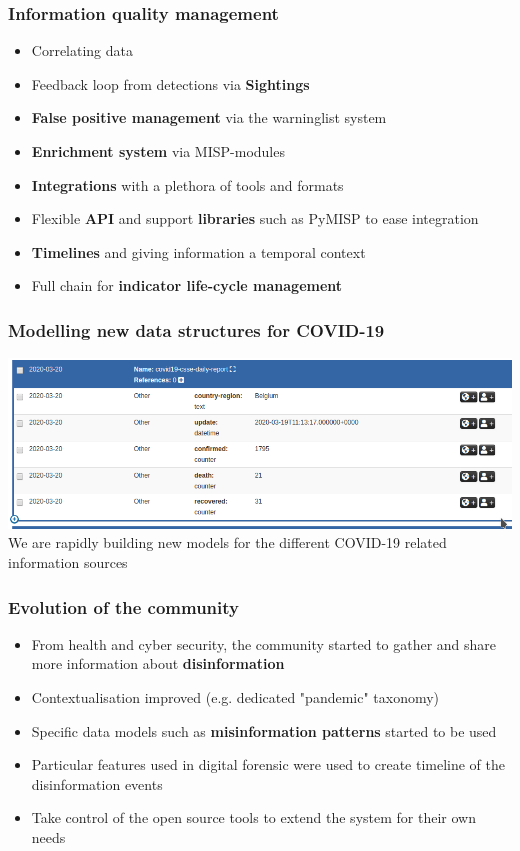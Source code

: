 \begin{frame}
\frametitle{Information quality management}
    \begin{itemize}
        \item Correlating data
        \item Feedback loop from detections via {\bf Sightings}
        \item {\bf False positive management} via the warninglist system
        \item {\bf Enrichment system} via MISP-modules
        \item {\bf Integrations} with a plethora of tools and formats
        \item Flexible {\bf API} and support {\bf libraries} such as PyMISP to ease integration
        \item {\bf Timelines} and giving information a temporal context
        \item Full chain for {\bf indicator life-cycle management}
    \end{itemize}
\end{frame}

\begin{frame}
    \frametitle{Modelling new data structures for COVID-19}
    \includegraphics[width=1.00\linewidth]{covidobject.png}
    We are rapidly building new models for the different COVID-19 related information sources
\end{frame}

\begin{frame}
    \frametitle{Evolution of the community}
    \begin{itemize}
            \item From health and cyber security, the community started to gather and share more information about {\bf disinformation}
            \item Contextualisation improved (e.g. dedicated "pandemic" taxonomy)
            \item Specific data models such as {\bf misinformation patterns} started to be used
            \item Particular features used in digital forensic were used to create timeline of the disinformation events
            \item Take control of the open source tools to extend the system for their own needs
    \end{itemize}
\end{frame}


